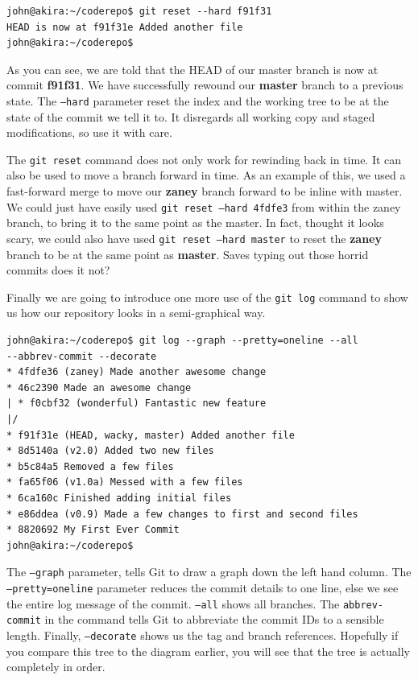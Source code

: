 \begin{Verbatim}[frame=leftline,framerule=1mm,fontsize=\relsize{-3}] 
john@akira:~/coderepo$ git reset --hard f91f31
HEAD is now at f91f31e Added another file
john@akira:~/coderepo$
\end{Verbatim}

As you can see, we are told that the HEAD of our master branch is now at commit \textbf{f91f31}.  We have successfully rewound our \textbf{master} branch to a previous state.  The \texttt{--hard} parameter reset the index and the working tree to be at the state of the commit we tell it to.  It disregards all working copy and staged modifications, so use it with care.

The \texttt{git reset} command does not only work for rewinding back in time.  It can also be used to move a branch forward in time.  As an example of this, we used a fast-forward merge to move our \textbf{zaney} branch forward to be inline with master.  We could just have easily used \texttt{git reset --hard 4fdfe3} from within the zaney branch, to bring it to the same point as the master.  In fact, thought it looks scary, we could also have used \texttt{git reset --hard master} to reset the \textbf{zaney} branch to be at the same point as \textbf{master}.  Saves typing out those horrid commits does it not?

Finally we are going to introduce one more use of the \texttt{git log} command to show us how our repository looks in a semi-graphical way.

\begin{Verbatim}[frame=leftline,framerule=1mm,fontsize=\relsize{-3}] 
john@akira:~/coderepo$ git log --graph --pretty=oneline --all 
--abbrev-commit --decorate
* 4fdfe36 (zaney) Made another awesome change
* 46c2390 Made an awesome change
| * f0cbf32 (wonderful) Fantastic new feature
|/  
* f91f31e (HEAD, wacky, master) Added another file
* 8d5140a (v2.0) Added two new files
* b5c84a5 Removed a few files
* fa65f06 (v1.0a) Messed with a few files
* 6ca160c Finished adding initial files
* e86ddea (v0.9) Made a few changes to first and second files
* 8820692 My First Ever Commit
john@akira:~/coderepo$ 
\end{Verbatim}

The \texttt{--graph} parameter, tells Git to draw a graph down the left hand column.  The \texttt{--pretty=oneline} parameter reduces the commit details to one line, else we see the entire log message of the commit.  \texttt{--all} shows all branches.  The \texttt{abbrev-commit} in the command tells Git to abbreviate the commit IDs to a sensible length.  Finally, \texttt{--decorate} shows us the tag and branch references.  Hopefully if you compare this tree to the diagram earlier, you will see that the tree is actually completely in order.

